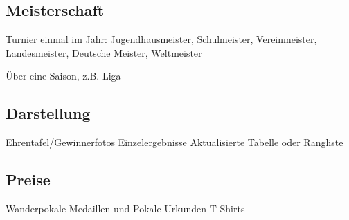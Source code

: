 \subsection{Meisterschaft}
\label{turniere:ergebnisse:rahmen:meisterschaft}

Turnier einmal im Jahr: Jugendhausmeister, Schulmeister, Vereinmeister, Landesmeister, Deutsche Meister, Weltmeister

Über eine Saison, z.B. Liga


\subsection{Darstellung}
\label{turniere:ergebnisse:formate}

Ehrentafel/Gewinnerfotos
Einzelergebnisse
Aktualisierte Tabelle oder Rangliste  

\subsection{Preise}
\label{turniere:ergebnisse:preise}

Wanderpokale
Medaillen und Pokale
Urkunden
T-Shirts





